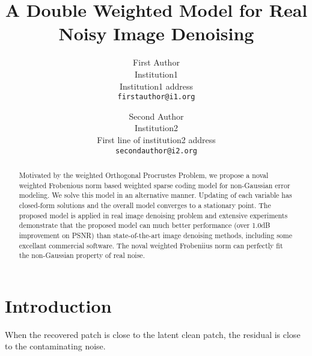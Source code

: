\documentclass[10pt,twocolumn,letterpaper]{article}
\begin{document}
\title{A Double Weighted Model for Real Noisy Image Denoising}

\author{First Author\\
Institution1\\
Institution1 address\\
{\tt\small firstauthor@i1.org}
\and
Second Author\\
Institution2\\
First line of institution2 address\\
{\tt\small secondauthor@i2.org}
}

\maketitle


\begin{abstract}
Motivated by the weighted Orthogonal Procrustes Problem, we propose a noval weighted Frobenious norm based weighted sparse coding model for non-Gaussian error modeling. We solve this model in an alternative manner. Updating of each variable has closed-form solutions and the overall model converges to a stationary point. The proposed model is applied in real image denoising problem and extensive experiments demonstrate that the proposed model can much better performance (over 1.0dB improvement on PSNR) than state-of-the-art image denoising methods, including some excellant commercial software. The noval weighted Frobeniius norm can perfectly fit the non-Gaussian property of real noise.
\end{abstract}

\section{Introduction}
When the recovered patch is close to the latent clean patch, the residual is close to the contaminating noise.
\end{document}
